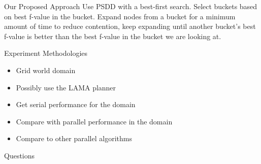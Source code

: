 \documentclass[style=simple]{powerdot}
\begin{document}
\begin{slide}{Our Proposed Approach}
Use PSDD with a best-first search.  Select buckets based on best
f-value in the bucket.  Expand nodes from a bucket for a minimum
amount of time to reduce contention, keep expanding until another
bucket's best f-value is better than the best f-value in the bucket we
are looking at.
\end{slide}

\begin{slide}{Experiment Methodologies}
  \begin{itemize}
    \item Grid world domain
    \item Possibly use the LAMA planner
    \item Get serial performance for the domain
    \item Compare with parallel performance in the domain
    \item Compare to other parallel algorithms
  \end{itemize}
\end{slide}

\begin{slide}{Questions}
\end{slide}
\end{document}

